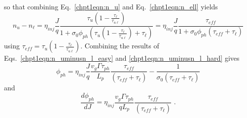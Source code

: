 \documentclass[12pt]{report}
\begin{document}
so that combining Eq.~\eqref{chpt1eqn:n_u} and Eq.~\eqref{chpt1eqn:n_ell} yields
\begin{equation}
\label{chpt1eqn:n_uminusn_l_hard}
n_u-n_\ell = \eta_\textit{inj}\frac{J}{q}  \frac{\tau_u \left(1-\frac{\tau_\ell}{\tau_{u\ell}}\right)}{1+\sigma_0 \phi_{ph} \left(\tau_u \left(1-\frac{\tau_\ell}{\tau_{u\ell}}\right) + \tau_\ell\right)} = \eta_\textit{inj}\frac{J}{q}  \frac{\tau_\textit{eff}}{1+\sigma_0 \phi_{ph} \left(\tau_\textit{eff} + \tau_\ell\right)}
\end{equation}
using $\tau_\textit{eff}=\tau_u\left(1-\frac{\tau_\ell}{\tau_{u\ell}}\right)$.
Combining the results of Eqs.~\eqref{chpt1eqn:n_uminusn_l_easy} and \eqref{chpt1eqn:n_uminusn_l_hard} gives
\begin{equation}
\phi_{ph} = \eta_\textit{inj} \frac{J}{q} \frac{v_g \Gamma \tau_{ph}}{L_p} \frac{\tau_\textit{eff}}{\left(\tau_\textit{eff}+\tau_\ell\right)} - \frac{1}{\sigma_0 \left(\tau_\textit{eff}+\tau_\ell\right)}
\end{equation}
and
\begin{equation}
\label{chpt1eqn:dflux_dJ}
\frac{d \phi_{ph}}{d\!J} = \eta_\textit{inj} \frac{v_g \Gamma \tau_{ph}}{q L_p} \frac{\tau_\textit{eff}}{\left(\tau_\textit{eff}+\tau_\ell\right)} \text{~.}
\end{equation}
\end{document}
